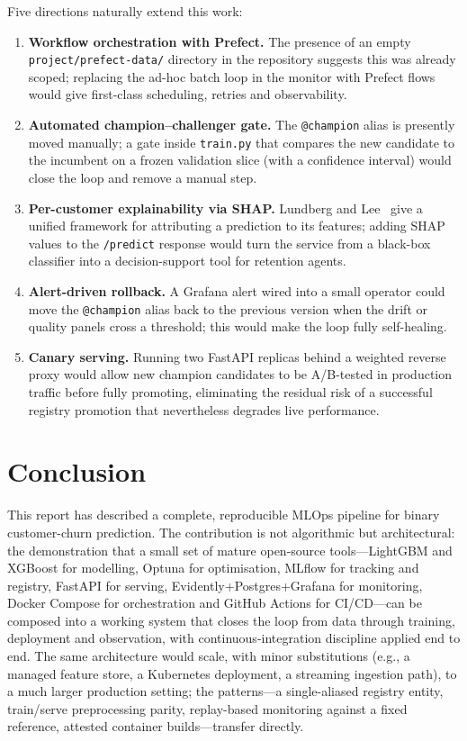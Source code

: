 \documentclass[conference,a4paper,10pt]{IEEEtran}
\begin{document}
Five directions naturally extend this work:
\begin{enumerate}
  \item \textbf{Workflow orchestration with Prefect.} The presence of
        an empty \texttt{project/prefect-data/} directory in the
        repository suggests this was already scoped; replacing the
        ad-hoc batch loop in the monitor with Prefect flows would
        give first-class scheduling, retries and observability.
  \item \textbf{Automated champion--challenger gate.} The
        \texttt{@champion} alias is presently moved manually; a gate
        inside \texttt{train.py} that compares the new candidate to
        the incumbent on a frozen validation slice (with a confidence
        interval) would close the loop and remove a manual step.
  \item \textbf{Per-customer explainability via SHAP.}
        Lundberg and Lee~\cite{lundberg2017shap} give a unified
        framework for attributing a prediction to its features; adding
        SHAP values to the \texttt{/predict} response would turn the
        service from a black-box classifier into a decision-support
        tool for retention agents.
  \item \textbf{Alert-driven rollback.} A Grafana alert wired into a
        small operator could move the \texttt{@champion} alias back
        to the previous version when the drift or quality panels cross
        a threshold; this would make the loop fully self-healing.
  \item \textbf{Canary serving.} Running two FastAPI replicas behind a
        weighted reverse proxy would allow new champion candidates to
        be A/B-tested in production traffic before fully promoting,
        eliminating the residual risk of a successful registry
        promotion that nevertheless degrades live performance.
\end{enumerate}

\section{Conclusion}\label{sec:conclusion}

This report has described a complete, reproducible MLOps pipeline for
binary customer-churn prediction. The contribution is not algorithmic
but architectural: the demonstration that a small set of mature
open-source tools---LightGBM and XGBoost for modelling, Optuna for
optimisation, MLflow for tracking and registry, FastAPI for serving,
Evidently+Postgres+Grafana for monitoring, Docker Compose for
orchestration and GitHub Actions for CI/CD---can be composed into a
working system that closes the loop from data through training,
deployment and observation, with continuous-integration discipline
applied end to end. The same architecture would scale, with minor
substitutions (e.g., a managed feature store, a Kubernetes deployment,
a streaming ingestion path), to a much larger production setting; the
patterns---a single-aliased registry entity, train/serve preprocessing
parity, replay-based monitoring against a fixed reference, attested
container builds---transfer directly.



\end{document}
